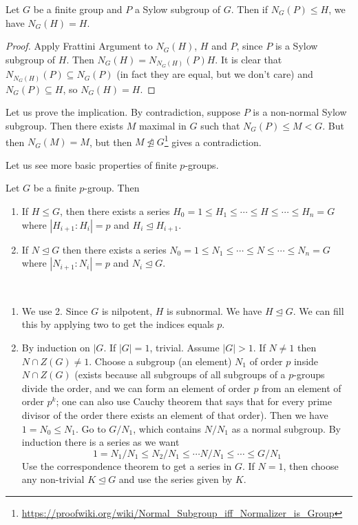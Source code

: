 \documentclass[twoside, 11pt]{article}
\begin{document}
\begin{dem}
\begin{itemize}
\begin{lemma}
Let $G$ be a finite group and $P$ a Sylow subgroup of $G$. Then if $N_G(P)\leq H$, we have $N_G(H)=H$.
\end{lemma}
\begin{proof}
Apply Frattini Argument to  $N_G(H)$, $H$ and $P$, since $P$ is a Sylow subgroup of $H$. Then $N_G(H)=N_{N_G(H)}(P)H$. It is clear that $N_{N_G(H)}(P)\subseteq N_G(P)$ (in fact they are equal, but we don't care) and $N_G(P)\subseteq H$, so $N_G(H)=H$. 
\end{proof}

Let us prove the implication. By contradiction, suppose $P$ is a non-normal Sylow subgroup. Then there exists $M$ maximal in $G$ such that $N_G(P)\leq M<G$.  But then $N_G(M)=M$, but then $M\not\trianglelefteq G$\footnote{\url{https://proofwiki.org/wiki/Normal_Subgroup_iff_Normalizer_is_Group}} gives a contradiction. 
\end{itemize}
\end{dem}

Let us see more basic properties of finite $p$-groups. 

\begin{teorema}
Let $G$ be a finite $p$-group. Then 
\begin{enumerate}
\item If $H\leq G$, then there exists a series $H_0=1\leq H_1\leq\cdots \leq H\leq \cdots \leq H_n=G$ where $|H_{i+1}:H_i|=p$ and $H_i\trianglelefteq H_{i+1}$. 
\item If $N\trianglelefteq G$ then there exists a series $N_0=1\leq N_1\leq\cdots \leq N\leq \cdots \leq N_n=G$ where $|N_{i+1}:N_i|=p$ and $N_i\trianglelefteq G$.
\end{enumerate}
\end{teorema}
\begin{dem}\
\begin{enumerate}
\item We use 2. Since $G$ is nilpotent, $H$ is subnormal. We have $H\trianglelefteq G$. We can fill this by applying two to get the indices equals $p$. 
\item By induction on $|G$. If $|G|=1$, trivial. Assume $|G|>1$. If $N\neq 1$ then $N\cap Z(G)\neq 1$. Choose a subgroup (an element) $N_1$ of order $p$ inside $N\cap Z(G)$ (exists because all subgroups of all subgroups of a $p$-groups divide the order, and we can form an element of order $p$ from an element of order $p^k$; one can also use Cauchy theorem that says that for every prime divisor of the order there exists an element of that order).  Then we have $1=N_0\leq N_1$. Go to $G/N_1$, which contains $N/N_1$ as a normal subgroup. By induction there is a series as we want
\[
1=N_1/N_1\leq N_2/N_1\leq \cdots N/N_1\leq\cdots\leq G/N_1
\]
Use the correspondence theorem to get a series in $G$. If $N=1$, then choose any non-trivial $K\trianglelefteq G$ and use the series given by $K$. 
\end{enumerate}

\end{dem}
\end{document}
